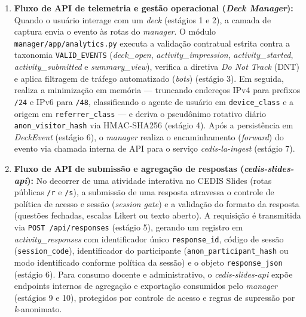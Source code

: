 \begin{enumerate}
    \item \textbf{Fluxo de API de telemetria e gestão operacional (\textit{Deck Manager}):} Quando o usuário interage com um \textit{deck} (estágios 1 e 2), a camada de captura envia o evento às rotas do \textit{manager}. O módulo \texttt{manager/app/analytics.py} executa a validação contratual estrita contra a taxonomia \texttt{VALID\_EVENTS} (\textit{deck\_open}, \textit{activity\_impression}, \textit{activity\_started}, \textit{activity\_submitted} e \textit{summary\_view}), verifica a diretiva \textit{Do Not Track} (DNT) e aplica filtragem de tráfego automatizado (\textit{bots}) (estágio 3). Em seguida, realiza a minimização em memória — truncando endereços IPv4 para prefixos \texttt{/24} e IPv6 para \texttt{/48}, classificando o agente de usuário em \texttt{device\_class} e a origem em \texttt{referrer\_class} — e deriva o pseudônimo rotativo diário \texttt{anon\_visitor\_hash} via HMAC-SHA256 (estágio 4). Após a persistência em \textit{DeckEvent} (estágio 6), o \textit{manager} realiza o encaminhamento (\textit{forward}) do evento via chamada interna de API para o serviço \textit{cedis-la-ingest} (estágio 7).

    \item \textbf{Fluxo de API de submissão e agregação de respostas (\textit{cedis-slides-api}):} No decorrer de uma atividade interativa no CEDIS Slides (rotas públicas \texttt{/r} e \texttt{/s}), a submissão de uma resposta atravessa o controle de política de acesso e sessão (\textit{session gate}) e a validação do formato da resposta (questões fechadas, escalas Likert ou texto aberto). A requisição é transmitida via \texttt{POST /api/responses} (estágio 5), gerando um registro em \textit{activity\_responses} com identificador único \texttt{response\_id}, código de sessão (\texttt{session\_code}), identificador do participante (\texttt{anon\_participant\_hash} ou modo identificado conforme política da sessão) e o objeto \texttt{response\_json} (estágio 6). Para consumo docente e administrativo, o \textit{cedis-slides-api} expõe endpoints internos de agregação e exportação consumidos pelo \textit{manager} (estágios 9 e 10), protegidos por controle de acesso e regras de supressão por \textit{k}-anonimato.


\end{enumerate}

